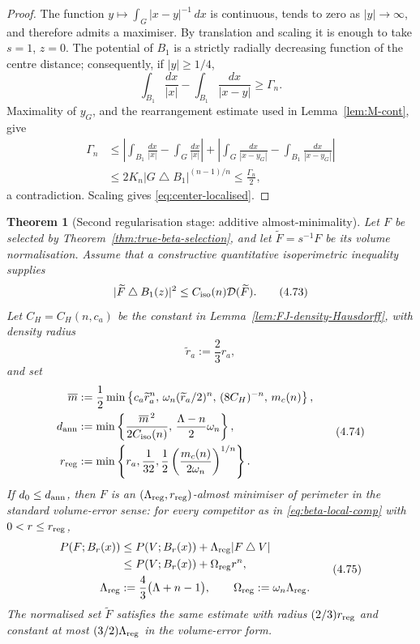 \documentclass[11pt]{amsart}
\newtheorem{theorem}{Theorem}[section]
\theoremstyle{definition}
\newcommand{\Per}{P}
\newcommand{\Def}{\mathcal D}
\begin{document}
\begin{proof}
The function \(y\mapsto\int_G|x-y|^{-1}\,dx\) is continuous, tends to
zero as \(|y|\to\infty\), and therefore admits a maximiser.  By
translation and scaling it is enough to take \(s=1\), \(z=0\).
The potential of \(B_1\) is a strictly radially decreasing function of
the centre distance; consequently, if \(|y|\ge1/4\),
\[
   \int_{B_1}\frac{dx}{|x|}
      -\int_{B_1}\frac{dx}{|x-y|}
   \ge\Gamma_n.
\]
Maximality of \(y_G\), and the rearrangement estimate used in
Lemma~\ref{lem:M-cont}, give
\[
\begin{aligned}
   \Gamma_n
   &\le
   \left|\int_{B_1}\frac{dx}{|x|}
          -\int_G\frac{dx}{|x|}\right|
   +\left|\int_G\frac{dx}{|x-y_G|}
          -\int_{B_1}\frac{dx}{|x-y_G|}\right|\\
   &\le 2K_n|G\mathbin{\triangle}B_1|^{(n-1)/n}
   \le\frac{\Gamma_n}{2},
\end{aligned}
\]
a contradiction.  Scaling gives \eqref{eq:center-localised}.
\end{proof}

\begin{theorem}[Second regularisation stage: additive almost-minimality]
\label{thm:additive-almost-min}
Let \(F\) be selected by Theorem~\ref{thm:true-beta-selection}, and let
\(\widetilde F=s^{-1}F\) be its volume normalisation.  Assume that a
constructive quantitative isoperimetric inequality supplies
\[
   |\widetilde F\mathbin{\triangle}B_1(z)|^2
   \le C_{\rm iso}(n)\Def(\widetilde F).
\tag{4.73}\label{eq:FMP-true-selected}
\]
Let \(C_H=C_H(n,c_a)\) be the constant in
Lemma~\ref{lem:FJ-density-Hausdorff}, with density radius
\[
   \widetilde r_a:=\frac23 r_a,
\]
and set
\[
\begin{aligned}
   \overline m
   &:=
   \frac12\min\left\{
        c_a\widetilde r_a^n,\,
        \omega_n(\widetilde r_a/2)^n,\,
        (8C_H)^{-n},\,
        m_c(n)\right\},\\
   d_{\rm ann}
   &:=
   \min\left\{
      \frac{\overline m^{\,2}}{2C_{\rm iso}(n)},\,
      \frac{\Lambda-n}{2}\omega_n
      \right\},\\
   r_{\rm reg}
   &:=
   \min\left\{
      r_a,\frac1{32},
      \frac12\left(\frac{m_c(n)}{2\omega_n}\right)^{1/n}
      \right\}.
\end{aligned}
\tag{4.74}\label{eq:annular-constants}
\]
If \(d_0\le d_{\rm ann}\), then \(F\) is an
\((\Lambda_{\rm reg},r_{\rm reg})\)-almost minimiser of perimeter in
the standard volume-error sense:
for every competitor as in \eqref{eq:beta-local-comp} with
\(0<r\le r_{\rm reg}\),
\[
\begin{aligned}
   \Per(F;B_r(x))
   &\le\Per(V;B_r(x))
       +\Lambda_{\rm reg}|F\mathbin{\triangle}V|\\
   &\le\Per(V;B_r(x))+\Omega_{\rm reg}r^n,\\
   \Lambda_{\rm reg}&:=\frac43\bigl(\Lambda+n-1\bigr),
   \qquad
   \Omega_{\rm reg}:=\omega_n\Lambda_{\rm reg}.
\end{aligned}
\tag{4.75}\label{eq:additive-almost}
\]
The normalised set \(\widetilde F\) satisfies the same estimate with
radius \((2/3)r_{\rm reg}\) and constant at most
\((3/2)\Lambda_{\rm reg}\) in the volume-error form.
\end{theorem}
\end{document}
